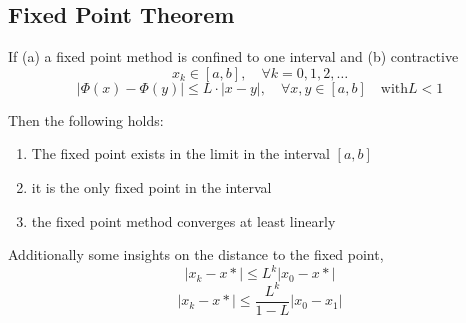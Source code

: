 \documentclass[
    a4paper,
    11pt
]{article}
\begin{document}
\subsection{Fixed Point Theorem}

If (a) a fixed point method is confined to one interval and (b) contractive
\begin{equation}
    x_k \in [a, b], \quad \forall k=0,1,2, \dots
\end{equation}
\begin{equation}
    |\Phi(x) - \Phi(y)| \leq L \cdot |x - y|, \quad \forall x, y \in [a, b]
    \quad \text{with} L<1
\end{equation}

Then the following holds:
\begin{enumerate}
    \item The fixed point exists in the limit in the interval $[a, b]$
    \item it is the only fixed point in the interval
    \item the fixed point method converges at least linearly
\end{enumerate}

Additionally some insights on the distance to the fixed point,
\begin{equation}
    |x_k - x*| \leq L^k |x_0 - x*|
\end{equation}
\begin{equation}
    |x_k - x* | \leq \frac{L^k}{1-L}|x_0 - x_1|
\end{equation}
\end{document}
